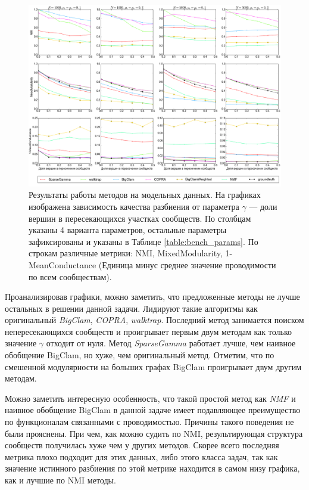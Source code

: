 \documentclass{ITaSconf}
\begin{document}
	\begin{figure}[!t]
		\centering
		\includegraphics[width=\textwidth]{imgs/experiments_all.png}
		\caption{Результаты работы методов на модельных данных. На графиках изображена зависимость качества разбиения от параметра $\gamma$ --- доли вершин в пересекающихся участках сообществ. По столбцам указаны 4 варианта параметров, остальные параметры зафиксированы и указаны в Таблице \ref{table:bench_params}. По строкам различные метрики: NMI, MixedModularity, 1-MeanConductance (Единица минус среднее значение проводимости по всем сообществам).}
		\label{fig:experiments}
	\end{figure}
	
	Проанализировав графики, можно заметить, что предложенные методы не лучше остальных в решении данной задачи. Лидируют такие алгоритмы как оригинальный \textit{BigClam}, \textit{COPRA}, \textit{walktrap}. Последний метод занимается поиском непересекающихся сообществ и проигрывает первым двум методам как только значение $\gamma$ отходит от нуля.
	Метод \textit{SparseGamma} работает лучше, чем наивное обобщение BigClam, но хуже, чем оригинальный метод. 
	Отметим, что по смешенной модулярности на больших графах BigClam проигрывает двум другим методам. 
	
	Можно заметить интересную особенность, что такой простой метод как \textit{NMF} и наивное обобщение BigClam в данной задаче имеет подавляющее преимущество по функционалам связанными с проводимостью. Причины такого поведения не были прояснены.
	При чем, как можно судить по NMI, результирующая структура сообществ получилась хуже чем у других методов. 
	Скорее всего последняя метрика плохо подходит для этих данных, либо этого класса задач, так как значение истинного разбиения по этой метрике находится в самом низу графика, как и лучшие по NMI методы.
	
\end{document}
